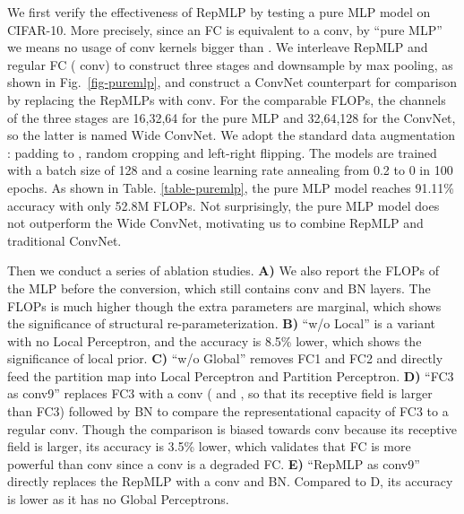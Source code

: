 \documentclass[10pt,twocolumn,letterpaper]{article}
\begin{document}
We first verify the effectiveness of RepMLP by testing a pure MLP model on CIFAR-10. More precisely, since an FC is equivalent to a  conv, by ``pure MLP'' we means no usage of conv kernels bigger than . We interleave RepMLP and regular FC ( conv) to construct three stages and downsample by max pooling, as shown in Fig.~\ref{fig-puremlp}, and construct a ConvNet counterpart for comparison by replacing the RepMLPs with  conv. For the comparable FLOPs, the channels of the three stages are 16,32,64 for the pure MLP and 32,64,128 for the ConvNet, so the latter is named Wide ConvNet. We adopt the standard data augmentation \cite{he2016deep}: padding to , random cropping and left-right flipping. The models are trained with a batch size of 128 and a cosine learning rate annealing from 0.2 to 0 in 100 epochs. As shown in Table. \ref{table-puremlp}, the pure MLP model reaches 91.11\% accuracy with only 52.8M FLOPs. Not surprisingly, the pure MLP model does not outperform the Wide ConvNet, motivating us to combine RepMLP and traditional ConvNet. 

Then we conduct a series of ablation studies. \textbf{A)} We also report the FLOPs of the MLP before the conversion, which still contains conv and BN layers. The FLOPs is much higher though the extra parameters are marginal, which shows the significance of structural re-parameterization. \textbf{B)} ``w/o Local'' is a variant with no Local Perceptron, and the accuracy is 8.5\% lower, which shows the significance of local prior. \textbf{C)} ``w/o Global'' removes FC1 and FC2 and directly feed the partition map into Local Perceptron and Partition Perceptron. \textbf{D)} ``FC3 as conv9'' replaces FC3 with a conv ( and , so that its receptive field is larger than FC3) followed by BN to compare the representational capacity of FC3 to a regular conv. Though the comparison is biased towards conv because its receptive field is larger, its accuracy is 3.5\% lower, which validates that FC is more powerful than conv since a conv is a degraded FC. \textbf{E)} ``RepMLP as conv9'' directly replaces the RepMLP with a  conv and BN. Compared to D, its accuracy is lower as it has no Global Perceptrons. 
\end{document}
